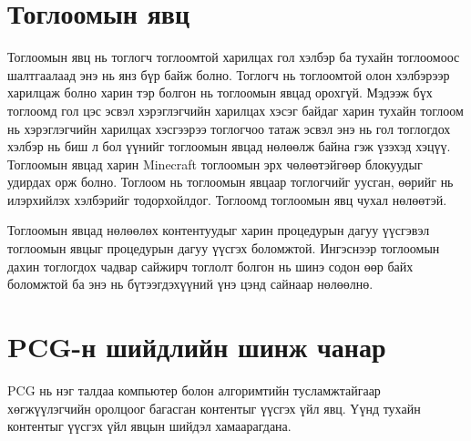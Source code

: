 \section{Тоглоомын явц}
Тоглоомын явц нь тоглогч тоглоомтой харилцах гол хэлбэр ба тухайн тоглоомоос шалтгаалаад энэ нь янз бүр байж болно. Тоглогч нь тоглоомтой олон хэлбэрээр харилцаж болно харин тэр болгон нь тоглоомын явцад орохгүй. Мэдээж бүх тоглоомд гол цэс эсвэл хэрэглэгчийн харилцах хэсэг байдаг харин тухайн тоглоом нь хэрэглэгчийн харилцах хэсгээрээ тоглогчоо татаж эсвэл энэ нь гол тоглогдох хэлбэр нь биш л бол үүнийг тоглоомын явцад нөлөөлж байна гэж үзэхэд хэцүү. Тоглоомын явцад харин Minecraft тоглоомын эрх чөлөөтэйгөөр блокуудыг удирдах орж болно. Тоглоом нь тоглоомын явцаар тоглогчийг уусган, өөрийг нь илэрхийлэх хэлбэрийг тодорхойлдог. Тоглоомд тоглоомын явц чухал нөлөөтэй.

Тоглоомын явцад нөлөөлөх контентуудыг харин процедурын дагуу үүсгэвэл тоглоомын явцыг процедурын дагуу үүсгэх боломжтой. Ингэснээр тоглоомын дахин тоглогдох чадвар сайжирч тоглолт болгон нь шинэ содон өөр байх боломжтой ба энэ нь бүтээгдэхүүний үнэ цэнд сайнаар нөлөөлнө.

\section{PCG-н шийдлийн шинж чанар}
PCG нь нэг талдаа компьютер болон алгоримтийн тусламжтайгаар хөгжүүлэгчийн оролцоог багасган контентыг үүсгэх үйл явц. Үүнд тухайн контентыг үүсгэх үйл явцын шийдэл хамаарагдана.

